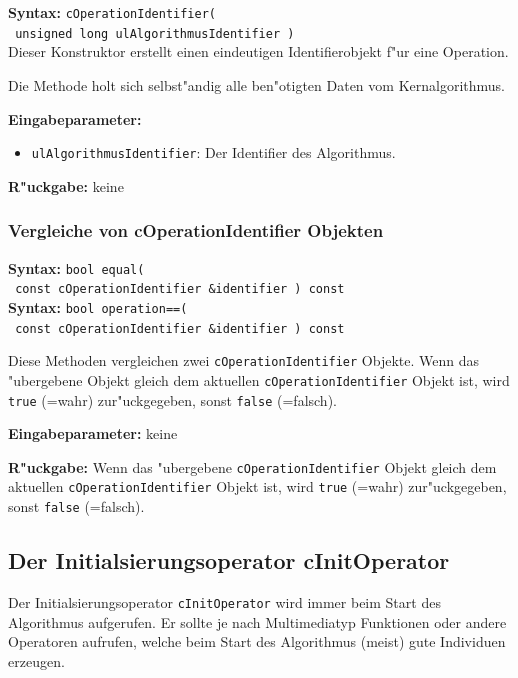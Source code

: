 \textbf{Syntax:} \verb|cOperationIdentifier(| \\\verb| unsigned long ulAlgorithmusIdentifier )| \\

Dieser Konstruktor erstellt einen eindeutigen Identifierobjekt f"ur eine Operation.

Die Methode holt sich selbst"andig alle ben"otigten Daten vom Kernalgorithmus.

\bigskip\noindent
\textbf{Eingabeparameter:}
\begin{itemize}
 \item \verb|ulAlgorithmusIdentifier|: Der Identifier des Algorithmus.
\end{itemize}

\bigskip\noindent
\textbf{R"uckgabe:} keine


\subsubsection{Vergleiche von cOperationIdentifier Objekten}

\textbf{Syntax:} \verb|bool equal(| \\\verb| const cOperationIdentifier &identifier ) const|\\
\textbf{Syntax:} \verb|bool operation==(| \\\verb| const cOperationIdentifier &identifier ) const|

\bigskip\noindent
Diese Methoden vergleichen zwei \verb|cOperationIdentifier| Objekte. Wenn das "ubergebene Objekt gleich dem aktuellen \verb|cOperationIdentifier| Objekt ist, wird \verb|true| (=wahr) zur"uckgegeben, sonst \verb|false| (=falsch).

\bigskip\noindent
\textbf{Eingabeparameter:} keine

\bigskip\noindent
\textbf{R"uckgabe:} Wenn das "ubergebene \verb|cOperationIdentifier| Objekt gleich dem aktuellen \verb|cOperationIdentifier| Objekt ist, wird \verb|true| (=wahr) zur"uckgegeben, sonst \verb|false| (=falsch).


\subsection{Der Initialsierungsoperator cInitOperator}

Der Initialsierungsoperator \verb|cInitOperator| wird immer beim Start des Algorithmus aufgerufen. Er sollte je nach Multimediatyp Funktionen oder andere Operatoren aufrufen, welche beim Start des Algorithmus (meist) gute Individuen erzeugen.

